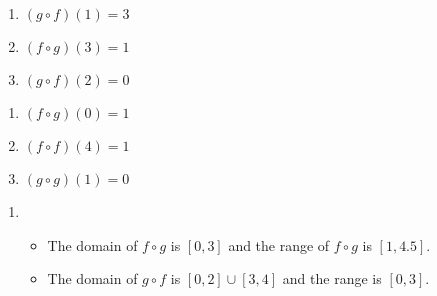 \documentclass{ximera}
\begin{document}
\begin{multicols}{3}
\begin{enumerate}
\setcounter{enumi}{\value{HW}}

\item  $(g\circ f)(1) = 3$ 
\item  $(f \circ g)(3) = 1$
\item  $(g\circ f)(2) = 0$
\setcounter{HW}{\value{enumi}}
\end{enumerate}
\end{multicols}

\begin{multicols}{3}
\begin{enumerate}
\setcounter{enumi}{\value{HW}}
\item  $(f\circ g)(0) = 1$  
\item  $(f\circ f)(4) = 1$
\item  $(g \circ g)(1) = 0$

\setcounter{HW}{\value{enumi}}
\end{enumerate}
\end{multicols}

\begin{enumerate}
\setcounter{enumi}{\value{HW}}

\item  \begin{itemize} \item The domain of $f \circ g$ is $[0,3]$ and the range of $f \circ g$ is $[1, 4.5]$.
\item The domain of $g \circ f$ is $[0,2] \cup [3,4]$ and the range is $[0,3]$.

\end{itemize}

\setcounter{HW}{\value{enumi}}
\end{enumerate}
\end{document}
